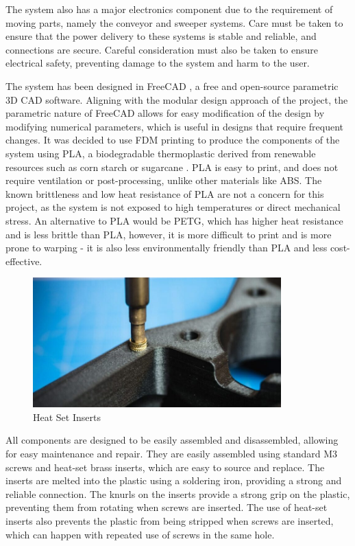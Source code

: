 The system also has a major electronics component due to the requirement of moving parts, namely the conveyor and sweeper systems. Care must be taken to ensure that the power delivery to these systems is stable and reliable, and connections are secure. Careful consideration must also be taken to ensure electrical safety, preventing damage to the system and harm to the user. 

The system has been designed in FreeCAD \cite{freecad}, a free and open-source parametric 3D CAD software. Aligning with the modular design approach of the project, the parametric nature of FreeCAD allows for easy modification of the design by modifying numerical parameters, which is useful in designs that require frequent changes. It was decided to use FDM printing to produce the components of the system using PLA, a biodegradable thermoplastic derived from renewable resources such as corn starch or sugarcane \cite{fdmmaterials}. PLA is easy to print, and does not require ventilation or post-processing, unlike other materials like ABS. The known brittleness and low heat resistance of PLA are not a concern for this project, as the system is not exposed to high temperatures or direct mechanical stress. An alternative to PLA would be PETG, which has higher heat resistance and is less brittle than PLA, however, it is more difficult to print and is more prone to warping - it is also less environmentally friendly than PLA and less cost-effective.

\begin{figure}[H]
    \begin{minipage}[h]{\textwidth}
        \centering
        \includegraphics[height=5cm]{imgs/parts/heatsetinserts.jpg}
        \caption{Heat Set Inserts \cite{heatsetinsert}}
    \end{minipage}
\end{figure}

All components are designed to be easily assembled and disassembled, allowing for easy maintenance and repair. They are easily assembled using standard M3 screws and heat-set brass inserts, which are easy to source and replace. The inserts are melted into the plastic using a soldering iron, providing a strong and reliable connection. The knurls on the inserts provide a strong grip on the plastic, preventing them from rotating when screws are inserted. The use of heat-set inserts also prevents the plastic from being stripped when screws are inserted, which can happen with repeated use of screws in the same hole.

